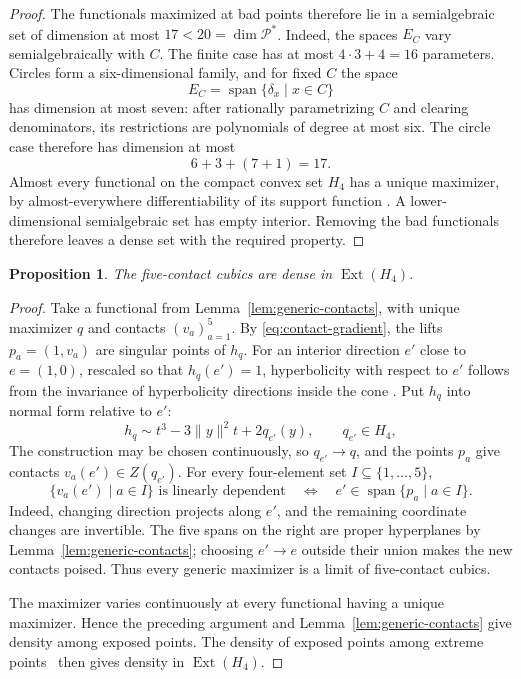 \documentclass[11pt,onecolumn]{article}
\theoremstyle{blueplain}
\newtheorem{proposition}[proposition]{Proposition}
\theoremstyle{bluedefinition}
\theoremstyle{bluedefinition}
\begin{document}
\begin{proof}
The functionals maximized at bad points therefore lie in a semialgebraic
set of dimension at most \(17<20=\dim\mathcal P^*\).  Indeed, the spaces \(E_C\) vary semialgebraically with \(C\). The finite case has at most
\(4\cdot3+4=16\) parameters.  Circles form a
six-dimensional family, and for fixed \(C\) the space
\[
 E_C=\operatorname{span}\{\delta_x\mid x\in C\}
\]
has dimension at most seven: after rationally parametrizing \(C\) and
clearing denominators, its restrictions are polynomials of degree at most
six.  The circle case therefore has
dimension at most
\[
 6+3+(7+1)=17.
\]
Almost every functional on the compact convex set \(H_4\) has a unique
maximizer, by almost-everywhere differentiability of its support function
\cite{Rockafellar}.   A lower-dimensional
semialgebraic set has empty interior.  Removing the bad functionals
therefore leaves a dense set with the required property.
\end{proof}

\begin{proposition}\label{prop:density-five}
The five-contact cubics are dense in
$\operatorname{Ext}(H_4)$.
\end{proposition}

\begin{proof}
Take a functional from Lemma~\ref{lem:generic-contacts}, with unique
maximizer $q$ and contacts $(v_a)_{a=1}^5$.  By
\eqref{eq:contact-gradient}, the lifts $p_a=(1,v_a)$ are singular points of
$h_q$.  For an interior direction $e'$ close to $e=(1,0)$, rescaled so that
$h_q(e')=1$, hyperbolicity with respect to $e'$ follows from the
invariance of hyperbolicity directions inside the cone
\cite{BauschkeGulerLewisSendov}.  Put $h_q$ into normal form relative to $e'$:
\[
 h_q\sim t^3-3\|y\|^2t+2q_{e'}(y),\qquad q_{e'}\in H_4,
\]
The construction may be chosen continuously, so $q_{e'}\to q$, and the
points $p_a$ give contacts $v_a(e')\in Z(q_{e'})$.
For every four-element set $I\subseteq\{1,\ldots,5\}$,
\[
 \{v_a(e')\mid a\in I\}\text{ is linearly dependent}
 \quad\Leftrightarrow\quad
 e'\in\operatorname{span}\{p_a\mid a\in I\}.
\]
Indeed, changing direction projects along $e'$, and the remaining coordinate
changes are invertible.  The five spans on the right are proper hyperplanes
by Lemma~\ref{lem:generic-contacts}; choosing $e'\to e$ outside their union
makes the new contacts poised.  Thus every generic maximizer is a limit of
five-contact cubics.

The maximizer varies continuously at every functional having a unique
maximizer.  Hence the preceding argument and Lemma~\ref{lem:generic-contacts}
give density among exposed points.  The density of exposed points among
extreme points~\cite{Rockafellar} then gives density
in $\operatorname{Ext}(H_4)$.
\end{proof}
\end{document}
